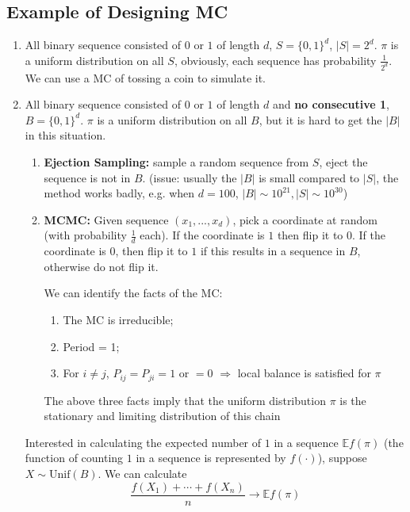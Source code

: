 \documentclass[11pt,a4paper]{article}
\begin{document}
\subsection{Example of Designing MC}
\begin{enumerate}
    \item All binary sequence consisted of $0$ or $1$ of length $d$, $S=\{0,1\}^d$, $|S|=2^d$. $\pi$ is a uniform distribution on all $S$, obviously, each sequence has probability $\frac{1}{2^d}$. We can use a MC of tossing a coin to simulate it.
    \item All binary sequence consisted of $0$ or $1$ of length $d$ and \textbf{no consecutive 1}, $B=\{0,1\}^d$. $\pi$ is a uniform distribution on all $B$, but it is hard to get the $|B|$ in this situation.
    \begin{enumerate}[-]
        \item \textbf{Ejection Sampling:} sample a random sequence from $S$, eject the sequence is not in $B$.
        (issue: usually the $|B|$ is small compared to $|S|$, the method works badly, e.g. when $d=100$, $|B|\sim 10^{21}, |S|\sim 10^{30}$)
        \item \textbf{MCMC:} Given sequence $(x_1,...,x_d)$, pick a coordinate at random (with probability $\frac{1}{d}$ each). If the coordinate is $1$ then flip it to $0$. If the coordinate is $0$, then flip it to $1$ if this results in a sequence in $B$, otherwise do not flip it.
        
        We can identify the facts of the MC:
        \begin{enumerate}[(1)]
            \item The MC is irreducible;
            \item Period = 1;
            \item For $i\neq j$, $P_{ij}=P_{ji}=1$ or $=0$ $\Rightarrow$ local balance is satisfied for $\pi$
        \end{enumerate}
        The above three facts imply that the uniform distribution $\pi$ is the stationary and limiting distribution of this chain
    \end{enumerate}
    Interested in calculating the expected number of $1$ in a sequence $\mathbb{E} f(\pi)$ (the function of counting $1$ in a sequence is represented by $f(\cdot)$), suppose $X\sim \text{Unif}(B)$. We can calculate $$\frac{f(X_1)+\cdots+f(X_n)}{n} \rightarrow \mathbb{E}f(\pi)$$
\end{enumerate}
\end{document}
